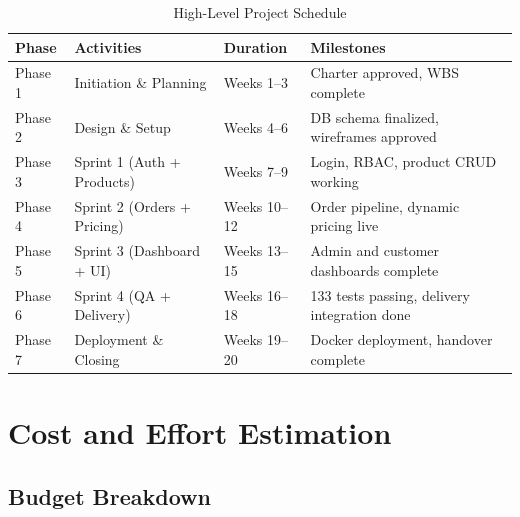 \documentclass[12pt,a4paper]{report}
\begin{document}
\begin{table}[H]
  \centering
  \caption{High-Level Project Schedule}
  \begin{tabularx}{\textwidth}{L{1.5cm} L{3.5cm} L{3cm} X}
    \toprule
    \textbf{Phase} & \textbf{Activities} & \textbf{Duration} & \textbf{Milestones} \\
    \midrule
    Phase 1 & Initiation \& Planning      & Weeks 1--3  & Charter approved, WBS complete \\
    Phase 2 & Design \& Setup             & Weeks 4--6  & DB schema finalized, wireframes approved \\
    Phase 3 & Sprint 1 (Auth + Products)  & Weeks 7--9  & Login, RBAC, product CRUD working \\
    Phase 4 & Sprint 2 (Orders + Pricing) & Weeks 10--12 & Order pipeline, dynamic pricing live \\
    Phase 5 & Sprint 3 (Dashboard + UI)   & Weeks 13--15 & Admin and customer dashboards complete \\
    Phase 6 & Sprint 4 (QA + Delivery)    & Weeks 16--18 & 133 tests passing, delivery integration done \\
    Phase 7 & Deployment \& Closing       & Weeks 19--20 & Docker deployment, handover complete \\
    \bottomrule
  \end{tabularx}
\end{table}

\section{Cost and Effort Estimation}

\subsection{Budget Breakdown}
\end{document}

